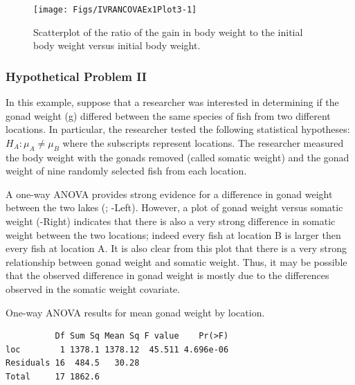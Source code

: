 \documentclass[10pt,openany]{book}\usepackage[]{graphicx}\usepackage[]{color}
\makeatletter
\newenvironment{kframe}{%
 \def\at@end@of@kframe{}%
 \ifinner\ifhmode%
  \def\at@end@of@kframe{\end{minipage}}%
  \begin{minipage}{\columnwidth}%
 \fi\fi%
 \def\FrameCommand##1{\hskip\@totalleftmargin \hskip-\fboxsep
 \colorbox{shadecolor}{##1}\hskip-\fboxsep
     \hskip-\linewidth \hskip-\@totalleftmargin \hskip\columnwidth}%
 \MakeFramed {\advance\hsize-\width
   \@totalleftmargin\z@ \linewidth\hsize
   \@setminipage}}%
 {\par\unskip\endMakeFramed%
 \at@end@of@kframe}
\newenvironment{knitrout}{}{} %
\makeatother
\begin{document}
\begin{knitrout}
\color{fgcolor}\begin{figure}[h]

{\centering \texttt{[image: Figs/IVRANCOVAEx1Plot3-1]} 

}

\caption[Scatterplot of the ratio of the gain in body weight to the initial body weight versus initial body weight]{Scatterplot of the ratio of the gain in body weight to the initial body weight versus initial body weight.}\label{fig:IVRANCOVAEx1Plot3}
\end{figure}


\end{knitrout}


\subsubsection*{Hypothetical Problem II}
In this example, suppose that a researcher was interested in determining if the gonad weight (g) differed between the same species of fish from two different locations.  In particular, the researcher tested the following statistical hypotheses: $H_{A}: \mu_{A}\neq\mu_{B}$ where the subscripts represent locations.  The researcher measured the body weight with the gonads removed (called somatic weight) and the gonad weight of nine randomly selected fish from each location.

A one-way ANOVA provides strong evidence for a difference in gonad weight between the two lakes (; -Left).  However, a plot of gonad weight versus somatic weight (-Right) indicates that there is also a very strong difference in somatic weight between the two locations; indeed every fish at location B is larger then every fish at location A.  It is also clear from this plot that there is a very strong relationship between gonad weight and somatic weight.  Thus, it may be possible that the observed difference in gonad weight is mostly due to the differences observed in the somatic weight covariate.

\begin{table}[h]
  \centering
  \caption{One-way ANOVA results for mean gonad weight by location.}\label{tab:IVRANCOVAEx2Res1}
\begin{knitrout}
\color{fgcolor}\begin{kframe}
\begin{verbatim}
          Df Sum Sq Mean Sq F value    Pr(>F)
loc        1 1378.1 1378.12  45.511 4.696e-06
Residuals 16  484.5   30.28                  
Total     17 1862.6                          
\end{verbatim}
\end{kframe}
\end{knitrout}
\end{table}
\end{document}
